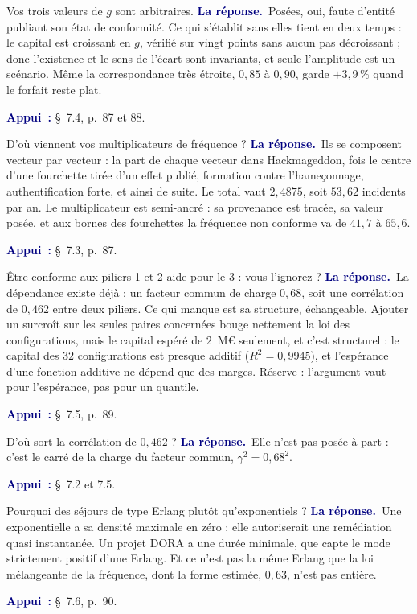 \documentclass[11pt,a4paper]{article}
\newcommand{\rep}[1]{\smallskip\noindent\textcolor{navy}{\textbf{La réponse.}}\ #1\par}
\newcommand{\appui}[1]{\smallskip\noindent\small\textcolor{navy}{\textbf{Appui~:}} #1\par\normalsize}
\begin{document}
\begin{question}{\og Vos trois valeurs de $g$ sont arbitraires.\fg{}}
\rep{Posées, oui, faute d'entité publiant son état de conformité. Ce qui s'établit sans elles
tient en deux temps : le capital est croissant en $g$, vérifié sur vingt points sans aucun pas
décroissant ; donc l'existence et le sens de l'écart sont invariants, et seule l'amplitude est un
scénario. Même la correspondance très étroite, $0{,}85$ à $0{,}90$, garde $+3{,}9\,\%$ quand le
forfait reste plat.}
\appui{\S~7.4, p.~87 et 88.}
\end{question}

\begin{question}{\og D'où viennent vos multiplicateurs de fréquence ?\fg{}}
\rep{Ils se composent vecteur par vecteur : la part de chaque vecteur dans Hackmageddon, fois le
centre d'une fourchette tirée d'un effet publié, formation contre l'hameçonnage, authentification
forte, et ainsi de suite. Le total vaut $2{,}4875$, soit $53{,}62$ incidents par an. Le
multiplicateur est semi-ancré : sa provenance est tracée, sa valeur posée, et aux bornes des
fourchettes la fréquence non conforme va de $41{,}7$ à $65{,}6$.}
\appui{\S~7.3, p.~87.}
\end{question}

\begin{question}{\og Être conforme aux piliers 1 et 2 aide pour le 3 : vous l'ignorez ?\fg{}}
\rep{La dépendance existe déjà : un facteur commun de charge $0{,}68$, soit une corrélation de
$0{,}462$ entre deux piliers. Ce qui manque est sa structure, échangeable. Ajouter un surcroît sur
les seules paires concernées bouge nettement la loi des configurations, mais le capital espéré de
$2$~M\euro{} seulement, et c'est structurel : le capital des $32$ configurations est presque
additif ($R^2=0{,}9945$), et l'espérance d'une fonction additive ne dépend que des marges.
Réserve : l'argument vaut pour l'espérance, pas pour un quantile.}
\appui{\S~7.5, p.~89.}
\end{question}

\begin{question}{\og D'où sort la corrélation de $0{,}462$ ?\fg{}}
\rep{Elle n'est pas posée à part : c'est le carré de la charge du facteur commun,
$\gamma^2=0{,}68^2$.}
\appui{\S~7.2 et 7.5.}
\end{question}

\begin{question}{\og Pourquoi des séjours de type Erlang plutôt qu'exponentiels ?\fg{}}
\rep{Une exponentielle a sa densité maximale en zéro : elle autoriserait une remédiation quasi
instantanée. Un projet DORA a une durée minimale, que capte le mode strictement positif d'une
Erlang. Et ce n'est pas la même Erlang que la loi mélangeante de la fréquence, dont la forme
estimée, $0{,}63$, n'est pas entière.}
\appui{\S~7.6, p.~90.}
\end{question}
\end{document}

